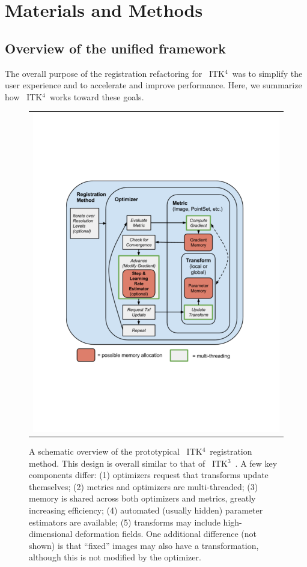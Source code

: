 \documentclass{frontiersSCNS}
\newcommand{\tk}{~ITK$^{\text{4}}$~}
\newcommand{\tkt}{~ITK$^{\text{3}}$~}
\begin{document}
\section{Materials and Methods}
\subsection{Overview of the unified framework}
The overall purpose of the registration refactoring for \tk was to
simplify the user experience and to accelerate and improve
performance. Here, we summarize how \tk works toward these goals.
\begin{figure}[t]
\begin{center}
\begin{tabular}{c}
\includegraphics[width=5in]{figs/software_design.pdf}
\end{tabular}
\caption{A schematic overview of the
  prototypical \tk registration method.  This design is overall similar to
  that of \tkt.  A few key components differ:  (1) optimizers request that
  transforms update themselves; (2) metrics and optimizers are
  multi-threaded; (3) memory is shared across both optimizers and metrics,
greatly increasing efficiency; (4) automated (usually hidden) parameter
estimators are available; (5) transforms may include high-dimensional
deformation fields.  One additional difference (not shown) is that ``fixed''
images may also have a transformation, although this is not modified
by the optimizer.}
\label{fig:softw}
\end{center}
\end{figure}
\end{document}

